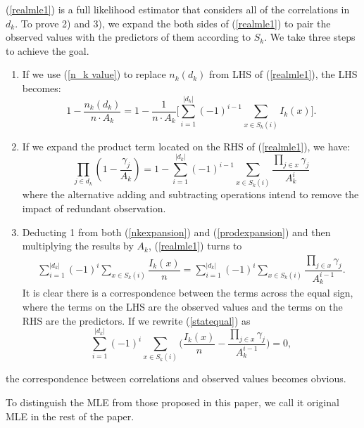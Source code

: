 \documentclass[10pt,onecolumn]{IEEEtran}
\begin{document}
\begin{IEEEproof}
(\ref{realmle1}) is a full likelihood estimator that considers all of the correlations in $d_k$. To prove 2) and 3),  we expand the both sides of (\ref{realmle1}) to pair the observed values with the  predictors of them according to $S_k$. We take three steps to achieve the goal.
\begin{enumerate}
\item  If  we use (\ref{n_k value}) to replace $n_k(d_k)$ from LHS of (\ref{realmle1}),  the LHS becomes:
\begin{equation}
1-\dfrac{n_k(d_k)}{n\cdot A_k}= 1-\dfrac{1}{n\cdot A_k}\big
[\sum_{i=1}^{|d_k|}(-1)^{i-1}\sum_{x \in S_k(i)}I_k(x)].
\label{nkexpansion}
\end{equation}
\item If we expand the product term located on  the RHS of (\ref{realmle1}), we have:
\begin{equation}
\prod_{j \in d_k}(1-\dfrac{\gamma_j}{A_k})=1-\sum_{i=1}^{|d_k|}(-1)^{i-1}\sum_{x \in S_k(i)}\dfrac{\prod_{j \in x} \gamma_j}{A_k^i} \label{prodexpansion}
\end{equation} where the alternative adding and subtracting operations intend to remove the impact of redundant observation.
\item Deducting 1 from both (\ref{nkexpansion}) and (\ref{prodexpansion})
and then multiplying the results by $A_k$, (\ref{realmle1}) turns to
\begin{eqnarray}
\sum_{i=1}^{|d_k|}(-1)^{i}\sum_{x \in S_k(i)}\dfrac{I_k(x)}{n}
=\sum_{i=1}^{|d_k|}(-1)^{i}\sum_{x \in S_k(i)}\dfrac{\prod_{j \in x} \gamma_j}{A_k^{i-1}}. \label{statequal}
\end{eqnarray}
It is clear there is a correspondence between the terms across
the equal sign, where the terms on the LHS are the observed values and the terms on the RHS are the predictors. If we rewrite
(\ref{statequal}) as
\begin{equation}
\sum_{i=1}^{|d_k|}(-1)^{i}\sum_{x \in S_k(i)}\Big(\dfrac{I_k(x)}{n} -\dfrac{\prod_{j \in x}
\gamma_j}{A_k^{i-1}}\Big)=0, \label{correspondence}
\end{equation}
\end{enumerate}
the correspondence between correlations and observed values becomes obvious.
\end{IEEEproof}

To distinguish the MLE from those proposed in this paper, we call it original MLE in the rest of the paper.
\end{document}
